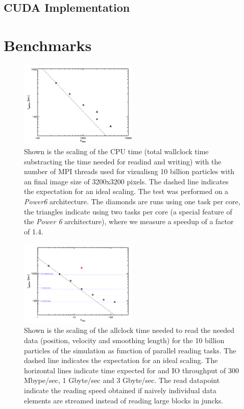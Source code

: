 \subsection{CUDA Implementation}
\label{cuda}

\section{Benchmarks}
\label{bench}

\begin{figure}
\begin{center}
\includegraphics[width=0.5\textwidth]{t_cpu.pdf}
\end{center}
\caption{Shown is the scaling of the CPU time (total wallclock time substracting the time needed for 
readind and writing) with the number of MPI threads used for vizualisng 10 billion particles with an final
image size of 3200x3200 pixels. The dashed line indicates the expectation for an ideal scaling. The test was 
performed on a {\it Power6} architecture. The diamonds are runs using one task per core, the triangles indicate
using two tasks per core (a special feature of the {\it Power 6} architecture), where we measure a speedup of 
a factor of 1.4.}\label{cpu_scaling}
\end{figure}

\begin{figure}
\begin{center}
\includegraphics[width=0.5\textwidth]{t_read.pdf}
\end{center}
\caption{Shown is the scaling of the allclock time needed to read the needed data 
(position, velocity and smoothing length) for the 10 billion particles of the simulation
as function of parallel reading tasks. The dashed line indicates the expectation for an 
ideal scaling. The horizontal lines indicate time expected for and IO throughput of 300 Mbype/sec,
1 Gbyte/sec and 3 Gbyte/sec. The read datapoint indicate the reading speed obtained if naively 
individual data elements are streamed instead of reading large blocks in juncks.}\label{read_scaling}
\end{figure}


